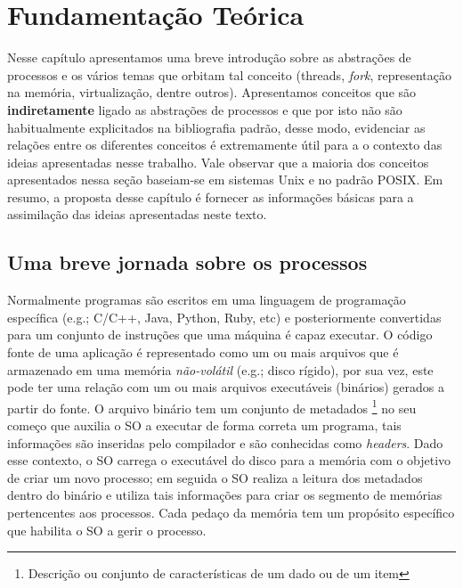\chapter{Fundamentação Teórica}

Nesse capítulo apresentamos uma breve introdução sobre as abstrações de
processos e os vários temas que orbitam tal conceito (threads, \emph{fork},
representação na memória, virtualização, dentre outros). Apresentamos conceitos
que são \textbf{indiretamente} ligado as abstrações de processos e que por isto
não são habitualmente explicitados na bibliografia padrão, desse modo,
evidenciar as relações entre os diferentes conceitos é extremamente útil para a
o contexto das ideias apresentadas nesse trabalho. Vale observar que a maioria
dos conceitos apresentados nessa seção baseiam-se em sistemas Unix e no padrão
POSIX. Em resumo, a proposta desse capítulo é fornecer as informações básicas
para a assimilação das ideias apresentadas neste texto.


\label{cap:fundamentacao-teorica}

\section{Uma breve jornada sobre os processos}
\label{sec:processos-e-threads}

Normalmente programas são escritos em uma linguagem de programação específica
(e.g.; C/C++, Java, Python, Ruby, etc) e posteriormente convertidas para um
conjunto de instruções que uma máquina é capaz executar. O código fonte de uma
aplicação é representado como um ou mais arquivos que é armazenado em uma
memória \emph{não-volátil} (e.g.; disco rígido), por sua vez, este pode ter uma
relação com um ou mais arquivos executáveis (binários) gerados a partir do
fonte. O arquivo binário tem um conjunto de metadados \footnote{Descrição ou
conjunto de características de um dado ou de um item} no seu começo que auxilia
o SO a executar de forma correta um programa, tais informações são inseridas
pelo compilador e são conhecidas como \emph{headers}. Dado esse contexto, o SO
carrega o executável do disco para a memória com o objetivo de criar um novo
processo; em seguida o SO realiza a leitura dos metadados dentro do binário e
utiliza tais informações para criar os segmento de memórias pertencentes aos
processos. Cada pedaço da memória tem um propósito específico que habilita
o SO a gerir o processo.

